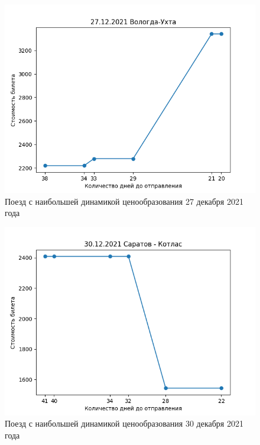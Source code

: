 \documentclass[conference]{IEEEtran}
\begin{document}
\begin{figure}
	\includegraphics[scale=0.5]{27122021}
	\caption{Поезд с наибольшей динамикой ценообразования 27 декабря 2021 года}
\end{figure}

\begin{figure}
	\includegraphics[scale=0.5]{30122021}
	\caption{Поезд с наибольшей динамикой ценообразования 30 декабря 2021 года}
\end{figure}
\end{document}
